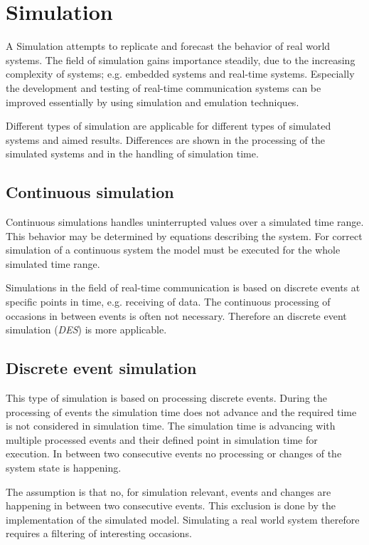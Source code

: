 \chapter{Simulation}
\label{cha:simulation}

A Simulation attempts to replicate and forecast the behavior of real world systems.
The field of simulation gains importance steadily, due to the increasing complexity of systems; e.g. embedded systems and real-time systems.
Especially the development and testing of real-time communication systems can be improved essentially by using simulation and emulation techniques.

Different types of simulation are applicable for different types of simulated systems and aimed results.
Differences are shown in the processing of the simulated systems and in the handling of simulation time.
\cite[section 1.2]{mchaney2009understanding}

\section{Continuous simulation}
\label{sec:simulation_cont}
Continuous simulations handles uninterrupted values over a simulated time range.
This behavior may be determined by equations describing the system.
For correct simulation of a continuous system the model must be executed for the whole simulated time range. \cite[section 1.2.1]{mchaney2009understanding}

Simulations in the field of real-time communication is based on discrete events at specific points in time, e.g. receiving of data.
The continuous processing of occasions in between events is often not necessary.
Therefore an discrete event simulation (\emph{DES}) is more applicable.

\section{Discrete event simulation}
\label{sec:simulation_event}
This type of simulation is based on processing discrete events.
During the processing of events the simulation time does not advance and the required time is not considered in simulation time.
The simulation time is advancing with multiple processed events and their defined point in simulation time for execution.
In between two consecutive events no processing or changes of the system state is happening. \cite[chapter 1]{matloff_introduction_2008}

The assumption is that no, for simulation relevant, events and changes are happening in between two consecutive events.
This exclusion is done by the implementation of the simulated model.
Simulating a real world system therefore requires a filtering of interesting occasions. \cite[section 4.1.1]{omnet_manual}

